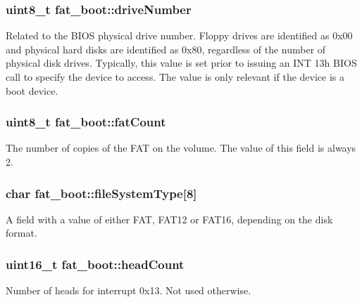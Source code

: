 \subsubsection[{\texorpdfstring{drive\+Number}{driveNumber}}]{\setlength{\rightskip}{0pt plus 5cm}uint8\+\_\+t fat\+\_\+boot\+::drive\+Number}\hypertarget{structfat__boot_aebd280b93563b75b9612d3db844b0d16}{}\label{structfat__boot_aebd280b93563b75b9612d3db844b0d16}
Related to the B\+I\+OS physical drive number. Floppy drives are identified as 0x00 and physical hard disks are identified as 0x80, regardless of the number of physical disk drives. Typically, this value is set prior to issuing an I\+NT 13h B\+I\+OS call to specify the device to access. The value is only relevant if the device is a boot device. 
\subsubsection[{\texorpdfstring{fat\+Count}{fatCount}}]{\setlength{\rightskip}{0pt plus 5cm}uint8\+\_\+t fat\+\_\+boot\+::fat\+Count}\hypertarget{structfat__boot_a04d3b6a45acf28a80ff909dc1b33da2f}{}\label{structfat__boot_a04d3b6a45acf28a80ff909dc1b33da2f}
The number of copies of the F\+AT on the volume. The value of this field is always 2. 
\subsubsection[{\texorpdfstring{file\+System\+Type}{fileSystemType}}]{\setlength{\rightskip}{0pt plus 5cm}char fat\+\_\+boot\+::file\+System\+Type\mbox{[}8\mbox{]}}\hypertarget{structfat__boot_aee529e32908406866f3ec3c17c4632fa}{}\label{structfat__boot_aee529e32908406866f3ec3c17c4632fa}
A field with a value of either F\+AT, F\+A\+T12 or F\+A\+T16, depending on the disk format. 
\subsubsection[{\texorpdfstring{head\+Count}{headCount}}]{\setlength{\rightskip}{0pt plus 5cm}uint16\+\_\+t fat\+\_\+boot\+::head\+Count}\hypertarget{structfat__boot_ae31da876cd9f48de5268a129218df2c2}{}\label{structfat__boot_ae31da876cd9f48de5268a129218df2c2}
Number of heads for interrupt 0x13. Not used otherwise. 
